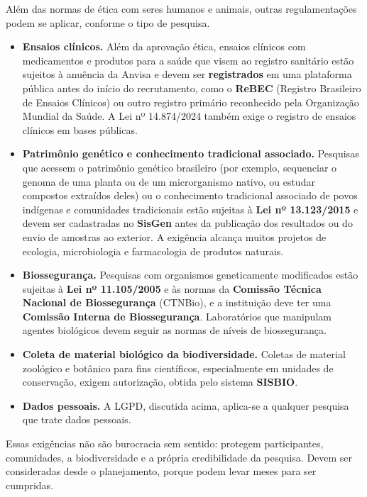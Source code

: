 \documentclass[
]{book}
\providecommand{\tightlist}{%
  \setlength{\itemsep}{0pt}\setlength{\parskip}{0pt}}
\begin{document}
Além das normas de ética com seres humanos e animais, outras regulamentações podem se aplicar, conforme o tipo de pesquisa.

\begin{itemize}
\tightlist
\item
  \textbf{Ensaios clínicos.} Além da aprovação ética, ensaios clínicos com medicamentos e produtos para a saúde que visem ao registro sanitário estão sujeitos à anuência da Anvisa e devem ser \textbf{registrados} em uma plataforma pública antes do início do recrutamento, como o \textbf{ReBEC} (Registro Brasileiro de Ensaios Clínicos) ou outro registro primário reconhecido pela Organização Mundial da Saúde. A Lei nº 14.874/2024 também exige o registro de ensaios clínicos em bases públicas.
\item
  \textbf{Patrimônio genético e conhecimento tradicional associado.} Pesquisas que acessem o patrimônio genético brasileiro (por exemplo, sequenciar o genoma de uma planta ou de um microrganismo nativo, ou estudar compostos extraídos deles) ou o conhecimento tradicional associado de povos indígenas e comunidades tradicionais estão sujeitas à \textbf{Lei nº 13.123/2015} e devem ser cadastradas no \textbf{SisGen} antes da publicação dos resultados ou do envio de amostras ao exterior. A exigência alcança muitos projetos de ecologia, microbiologia e farmacologia de produtos naturais.
\item
  \textbf{Biossegurança.} Pesquisas com organismos geneticamente modificados estão sujeitas à \textbf{Lei nº 11.105/2005} e às normas da \textbf{Comissão Técnica Nacional de Biossegurança} (CTNBio), e a instituição deve ter uma \textbf{Comissão Interna de Biossegurança}. Laboratórios que manipulam agentes biológicos devem seguir as normas de níveis de biossegurança.
\item
  \textbf{Coleta de material biológico da biodiversidade.} Coletas de material zoológico e botânico para fins científicos, especialmente em unidades de conservação, exigem autorização, obtida pelo sistema \textbf{SISBIO}.
\item
  \textbf{Dados pessoais.} A LGPD, discutida acima, aplica-se a qualquer pesquisa que trate dados pessoais.
\end{itemize}

Essas exigências não são burocracia sem sentido: protegem participantes, comunidades, a biodiversidade e a própria credibilidade da pesquisa. Devem ser consideradas desde o planejamento, porque podem levar meses para ser cumpridas.
\end{document}
